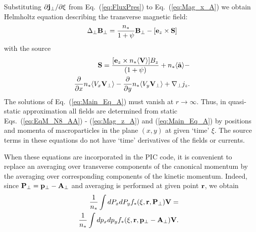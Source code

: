 \documentclass[twocolumn,showpacs,aip]{revtex4}
\begin{document}
\begin{appendix}
Substituting ${\partial {\bf{j}}_{\perp}}/{\partial\xi}$ from Eq.~(\ref{eq:FluxPres}) to Eq.~(\ref{eq:Mag_x_A}) we obtain Helmholtz equation describing the transverse magnetic field:
\begin{eqnarray}
&&\Delta_{\perp}{\bf{B}}_{\perp}=\frac{n_{*}}{1+\psi}{\bf{B}}_{\perp}- [{\bf{e}}_z \times{\bf{S}}]
\label{eq:Main_Eq_A}
\end{eqnarray}
with the source  
\begin{eqnarray}
&&{\bf{S}}= \frac{[{\bf{e}}_z \times  n_*\langle{\bf{V}}\rangle]B_z}
{(1+\psi)}+n_{*}\langle\tilde{\bf{a}}\rangle-\nonumber\\
&&\frac{\partial}{\partial x}n_{*}\langle V_x{\bf{V}}_{\perp}\rangle-\frac{\partial}{\partial y}n_{*}\langle V_y{\bf{V}}_{\perp}\rangle +\nabla_{\perp}j_z.
\label{eq:FluxCurr1_A}
\end{eqnarray}
The solutions of Eq.~(\ref{eq:Main_Eq_A})  must vanish at $r\rightarrow\infty$.
Thus, in quasi-static approximation all fields are determined
from static Eqs.~(\ref{eq:EqM_N8_AA}) - (\ref{eq:Mag_z_A})  and (\ref{eq:Main_Eq_A}) by positions  and momenta
 of macroparticles in the plane $(x,y)$ at given `time' $\xi$. The source
terms in these equations do not have `time' derivatives of
the fields or currents.

When these equations are incorporated in the PIC code, it is convenient to replace an averaging over transverse components of the canonical momentum   by  the averaging over corresponding  components of the kinetic momentum. Indeed, since ${\bf{P}}_{\perp}={\bf{p}}_{\perp}-{\bf{A}}_{\perp}$ and averaging is performed at given point ${\bf{r}}$, we obtain 
\begin{eqnarray}
\frac{1}{n_*}\int dP_xdP_yf_*(\xi,{\bf{r}},{\bf{P}}_{\perp}){\bf{V}}= 
\nonumber\\
\frac{1}{n_*}\int dp_xdp_y
f_*(\xi,{\bf{r}},{\bf{p}}_{\perp}-
{\bf{A}}_{\perp}){\bf{V}}.
\label{eq:last_Eq_A}
\end{eqnarray}


\end{appendix}





  \nocite{*}

%
%
 
\end{document}
